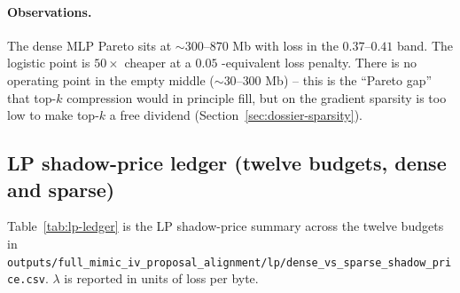 \paragraph{Observations.}
The dense MLP Pareto sits at $\sim$$300$--$870$ Mb with loss in the
$0.37$--$0.41$ band. The logistic point is $50\!\times$ cheaper at a
$0.05$ \auprc{}-equivalent loss penalty. There is no operating
point in the empty middle ($\sim$$30$--$300$ Mb) -- this is the
``Pareto gap'' that top-$k$ compression would in principle fill,
but on \mimic{} the gradient sparsity is too low to make
top-$k$ a free dividend (Section~\ref{sec:dossier-sparsity}).

\subsection{LP shadow-price ledger (twelve budgets, dense and sparse)}

Table~\ref{tab:lp-ledger} is the LP shadow-price summary across the
twelve budgets in
\texttt{outputs/full\_mimic\_iv\_proposal\_alignment/lp/dense\_vs\_sparse\_shadow\_price.csv}.
$\lambda$ is reported in units of loss per byte.

